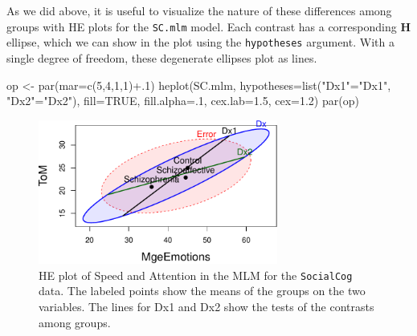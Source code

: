 \documentclass[
  letterpaper,
  10pt,
  krantz2]{krantz}
\makeatletter
\newenvironment{Shaded}{\begin{snugshade}}{\end{snugshade}}
\newcommand{\AttributeTok}[1]{\textcolor[rgb]{0.40,0.45,0.13}{#1}}
\newcommand{\ConstantTok}[1]{\textcolor[rgb]{0.56,0.35,0.01}{#1}}
\newcommand{\DecValTok}[1]{\textcolor[rgb]{0.68,0.00,0.00}{#1}}
\newcommand{\FloatTok}[1]{\textcolor[rgb]{0.68,0.00,0.00}{#1}}
\newcommand{\FunctionTok}[1]{\textcolor[rgb]{0.28,0.35,0.67}{#1}}
\newcommand{\NormalTok}[1]{\textcolor[rgb]{0.00,0.23,0.31}{#1}}
\newcommand{\OtherTok}[1]{\textcolor[rgb]{0.00,0.23,0.31}{#1}}
\newcommand{\SpecialCharTok}[1]{\textcolor[rgb]{0.37,0.37,0.37}{#1}}
\newcommand{\StringTok}[1]{\textcolor[rgb]{0.13,0.47,0.30}{#1}}
\newenvironment{kframe}{%
  \medskip{}
  \setlength{\fboxsep}{.8em}
  \def\at@end@of@kframe{}%
  \ifinner\ifhmode%
  \def\at@end@of@kframe{\end{minipage}}%
  \begin{minipage}{\columnwidth}%
  \fi\fi%
  \def\FrameCommand##1{\hskip\@totalleftmargin \hskip-\fboxsep
  \colorbox{shadecolor}{##1}\hskip-\fboxsep
      \hskip-\linewidth \hskip-\@totalleftmargin \hskip\columnwidth}%
  \MakeFramed {\advance\hsize-\width
    \@totalleftmargin\z@ \linewidth\hsize
    \@setminipage}}%
{\par\unskip\endMakeFramed%
  \at@end@of@kframe}
\renewenvironment{Shaded}{\begin{kframe}}{\end{kframe}}
\makeatother
\begin{document}
As we did above, it is useful to visualize the nature of these
differences among groups with HE plots for the \texttt{SC.mlm} model.
Each contrast has a corresponding \(\mathbf{H}\) ellipse, which we can
show in the plot using the \texttt{hypotheses} argument. With a single
degree of freedom, these degenerate ellipses plot as lines.

\begin{Shaded}
\begin{Highlighting}[]
\NormalTok{op }\OtherTok{\textless{}{-}} \FunctionTok{par}\NormalTok{(}\AttributeTok{mar=}\FunctionTok{c}\NormalTok{(}\DecValTok{5}\NormalTok{,}\DecValTok{4}\NormalTok{,}\DecValTok{1}\NormalTok{,}\DecValTok{1}\NormalTok{)}\SpecialCharTok{+}\NormalTok{.}\DecValTok{1}\NormalTok{)}
\FunctionTok{heplot}\NormalTok{(SC.mlm, }
       \AttributeTok{hypotheses=}\FunctionTok{list}\NormalTok{(}\StringTok{"Dx1"}\OtherTok{=}\StringTok{"Dx1"}\NormalTok{, }\StringTok{"Dx2"}\OtherTok{=}\StringTok{"Dx2"}\NormalTok{),}
       \AttributeTok{fill=}\ConstantTok{TRUE}\NormalTok{, }\AttributeTok{fill.alpha=}\NormalTok{.}\DecValTok{1}\NormalTok{,}
       \AttributeTok{cex.lab=}\FloatTok{1.5}\NormalTok{, }\AttributeTok{cex=}\FloatTok{1.2}\NormalTok{)}
\FunctionTok{par}\NormalTok{(op)}
\end{Highlighting}
\end{Shaded}

\begin{figure}[H]

{\centering \includegraphics[width=0.7\textwidth,height=\textheight]{figs/fig-SC-HEplot-1.pdf}

}

\caption{\label{fig-SC-HEplot}HE plot of Speed and Attention in the MLM
for the \texttt{SocialCog} data. The labeled points show the means of
the groups on the two variables. The lines for Dx1 and Dx2 show the
tests of the contrasts among groups.}

\end{figure}
\end{document}
